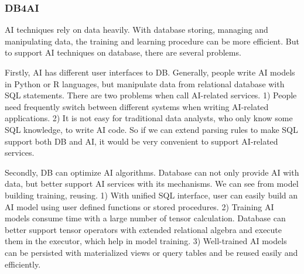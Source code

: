 

\subsubsection{DB4AI}
AI techniques rely on data heavily. With database storing, managing and manipulating data, the training and learning procedure can be more efficient. But to support AI techniques on database, there are several problems. 

Firstly, AI has different user interfaces to DB. Generally, people write AI models in Python or R languages, but manipulate data from relational database with SQL statements. There are two problems when call AI-related services. 1) People need frequently switch between different systems when writing AI-related applications. 2) It is not easy for traditional data analysts, who only know some SQL knowledge, to write AI code. So if we can extend parsing rules to make SQL support both DB and AI, it would be very convenient to support AI-related  services.

Secondly, DB can optimize AI algorithms. Database can not only provide AI with data, but better support AI services with its mechanisms. We can see from model building training, reusing. 1) With unified SQL interface, user can easily build an AI model using user defined functions or stored procedures. 2) Training AI models consume time with a large number of tensor calculation. Database can better support tensor operators with extended relational algebra and execute them in the executor, which help in model training. 3) Well-trained AI models can be persisted with materialized views or query tables and be reused easily and efficiently.


